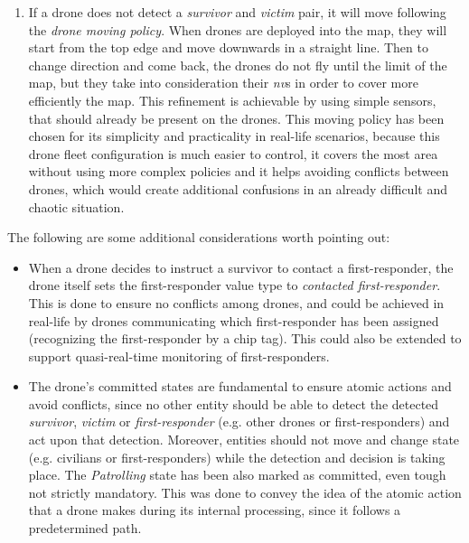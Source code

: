 \begin{enumerate}
\begin{enumerate}
		\item If a drone does not detect a \textit{survivor} and \textit{victim} pair, it will move following the \textit{drone moving policy}. When drones are deployed into the map, they will start from the top edge and move downwards in a straight line. Then to change direction and come back, the drones do not fly until the limit of the map, but they take into consideration their \textit{nv}s in order to cover more efficiently the map. This refinement is achievable by using simple sensors, that should already be present on the drones. This moving policy has been chosen for its simplicity and practicality in real-life scenarios, because this drone fleet configuration is much easier to control, it covers the most area without using more complex policies and it helps avoiding conflicts between drones, which would create additional confusions in an already difficult and chaotic situation.
	\end{enumerate}
\end{enumerate}
The following are some additional considerations worth pointing out:
\begin{itemize}
	\item 	When a drone decides to instruct a survivor to contact a first-responder, the drone itself sets the first-responder value type to \textit{contacted first-responder}. This is done to ensure no conflicts among drones, and could be achieved in real-life by drones communicating which first-responder has been assigned (recognizing the first-responder by a chip tag). This could also be extended to support quasi-real-time monitoring of first-responders.
	\item 	The drone's committed states are fundamental to ensure atomic actions and avoid conflicts, since no other entity should be able to detect the detected \textit{survivor}, \textit{victim} or \textit{first-responder} (e.g. other drones or first-responders) and act upon that detection. Moreover, entities should not move and change state (e.g. civilians or first-responders) while the detection and decision is taking place. The \textit{Patrolling} state has been also marked as committed, even tough not strictly mandatory. This was done to convey the idea of the atomic action that a drone makes during its internal processing, since it follows a predetermined path.
\end{itemize}

